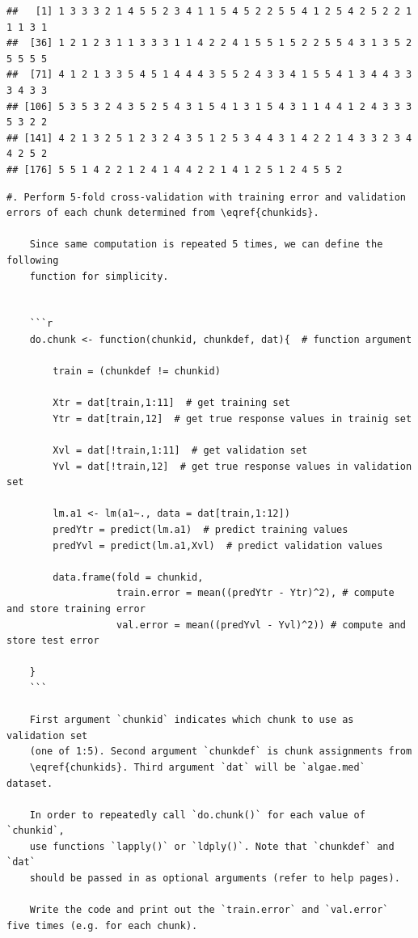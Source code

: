 \documentclass[]{article}
\begin{document}
\begin{verbatim}
##   [1] 1 3 3 3 2 1 4 5 5 2 3 4 1 1 5 4 5 2 2 5 5 4 1 2 5 4 2 5 2 2 1 1 1 3 1
##  [36] 1 2 1 2 3 1 1 3 3 3 1 1 4 2 2 4 1 5 5 1 5 2 2 5 5 4 3 1 3 5 2 5 5 5 5
##  [71] 4 1 2 1 3 3 5 4 5 1 4 4 4 3 5 5 2 4 3 3 4 1 5 5 4 1 3 4 4 3 3 3 4 3 3
## [106] 5 3 5 3 2 4 3 5 2 5 4 3 1 5 4 1 3 1 5 4 3 1 1 4 4 1 2 4 3 3 3 5 3 2 2
## [141] 4 2 1 3 2 5 1 2 3 2 4 3 5 1 2 5 3 4 4 3 1 4 2 2 1 4 3 3 2 3 4 4 2 5 2
## [176] 5 5 1 4 2 2 1 2 4 1 4 4 2 2 1 4 1 2 5 1 2 4 5 5 2
\end{verbatim}

\begin{verbatim}
#. Perform 5-fold cross-validation with training error and validation
errors of each chunk determined from \eqref{chunkids}. 

    Since same computation is repeated 5 times, we can define the following
    function for simplicity.


    ```r
    do.chunk <- function(chunkid, chunkdef, dat){  # function argument
      
        train = (chunkdef != chunkid)
    
        Xtr = dat[train,1:11]  # get training set
        Ytr = dat[train,12]  # get true response values in trainig set
    
        Xvl = dat[!train,1:11]  # get validation set
        Yvl = dat[!train,12]  # get true response values in validation set
    
        lm.a1 <- lm(a1~., data = dat[train,1:12])
        predYtr = predict(lm.a1)  # predict training values
        predYvl = predict(lm.a1,Xvl)  # predict validation values
    
        data.frame(fold = chunkid,
                   train.error = mean((predYtr - Ytr)^2), # compute and store training error
                   val.error = mean((predYvl - Yvl)^2)) # compute and store test error
    
    }
    ```
    
    First argument `chunkid` indicates which chunk to use as validation set
    (one of 1:5). Second argument `chunkdef` is chunk assignments from
    \eqref{chunkids}. Third argument `dat` will be `algae.med` dataset.
    
    In order to repeatedly call `do.chunk()` for each value of `chunkid`,
    use functions `lapply()` or `ldply()`. Note that `chunkdef` and `dat`
    should be passed in as optional arguments (refer to help pages).

    Write the code and print out the `train.error` and `val.error` five times (e.g. for each chunk).
\end{verbatim}
\end{document}
